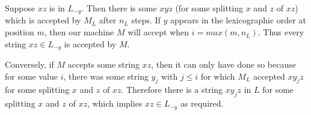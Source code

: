 \documentclass{article}
\begin{document}
\begin{description}
        Suppose $xz$ is in $L_{-y}$. Then there is some $xyz$ (for some
        splitting $x$ and $z$ of $xz$) which is accepted
        by $M_L$ after $n_L$ steps. If $y$ appears in the lexicographic order
        at position $m$, then our machine $M$ will accept when $i = max(m,
        n_L)$. Thus every string $xz \in L_{-y}$ is accepted by $M$.

        Conversely, if $M$ accepts some string $xz$, then it can only have done
        so because for some value $i$, there was some string $y_j$ with
        $j \leq i$ for which $M_L$ accepted $xy_jz$ for some splitting
        $x$ and $z$ of $xz$. Therefore there is a string
        $xy_jz$ in $L$ for some splitting $x$ and $z$ of $xz$, which implies $xz \in
        L_{-y}$ as required.
\end{description}
\newpage

\end{document}
